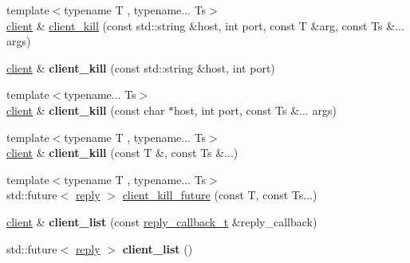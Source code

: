 \begin{DoxyCompactItemize}
\item 
{\footnotesize template$<$typename T , typename... Ts$>$ }\\\hyperlink{classcpp__redis_1_1client}{client} \& \hyperlink{classcpp__redis_1_1client_ae4090830d1710276c33ff5a74eba2e4b}{client\+\_\+kill} (const std\+::string \&host, int port, const T \&arg, const Ts \&... args)
\item 
\mbox{\label{classcpp__redis_1_1client_a3163e1f29d65a5e7b0d4165be154fb96}} 
\hyperlink{classcpp__redis_1_1client}{client} \& {\bfseries client\+\_\+kill} (const std\+::string \&host, int port)
\item 
\mbox{\label{classcpp__redis_1_1client_a38df8e614a5ac9533a1993b7dec7be6b}} 
{\footnotesize template$<$typename... Ts$>$ }\\\hyperlink{classcpp__redis_1_1client}{client} \& {\bfseries client\+\_\+kill} (const char $\ast$host, int port, const Ts \&... args)
\item 
\mbox{\label{classcpp__redis_1_1client_a1e2dd6cdcdb4307ceda0f866fe0a154f}} 
{\footnotesize template$<$typename T , typename... Ts$>$ }\\\hyperlink{classcpp__redis_1_1client}{client} \& {\bfseries client\+\_\+kill} (const T \&, const Ts \&...)
\item 
{\footnotesize template$<$typename T , typename... Ts$>$ }\\std\+::future$<$ \hyperlink{classcpp__redis_1_1reply}{reply} $>$ \hyperlink{classcpp__redis_1_1client_ae6f09b6c022c910b79fb90a47291f511}{client\+\_\+kill\+\_\+future} (const T, const Ts...)
\item 
\mbox{\label{classcpp__redis_1_1client_a9c2e307ab54f42ce50bdd42e1c6a363b}} 
\hyperlink{classcpp__redis_1_1client}{client} \& {\bfseries client\+\_\+list} (const \hyperlink{classcpp__redis_1_1client_a061a1140d36d2eaeda82b09a0bb3f9f2}{reply\+\_\+callback\+\_\+t} \&reply\+\_\+callback)
\item 
\mbox{\label{classcpp__redis_1_1client_a0480140cc584e6dd2a0a6fab9da10cc5}} 
std\+::future$<$ \hyperlink{classcpp__redis_1_1reply}{reply} $>$ {\bfseries client\+\_\+list} ()
\item 
\mbox{\label{classcpp__redis_1_1client_ac4e058eaa75eb04c7a8017a779d5015e}} 

\end{DoxyCompactItemize}

